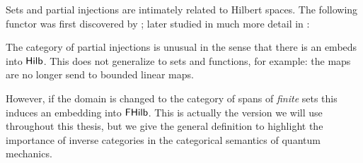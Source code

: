 Sets and partial injections are intimately related to Hilbert spaces.  The following functor was first discovered by \cite{barr}; later studied in much more detail in \cite{elltwo}:
The category of partial injections is unusual in the sense that there is an embeds into $\mathsf{Hilb}$. This does not generalize to sets and functions, for example: the maps are no longer send to bounded linear maps.

However, if the domain is changed to the category of spans of {\em finite} sets this induces an embedding into $\mathsf{FHilb}$.  This is actually the version we will use throughout this thesis, but we give the general definition to highlight the importance of inverse categories in the categorical semantics of quantum mechanics.


